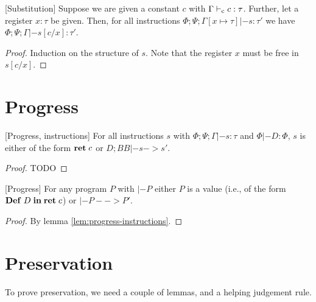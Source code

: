 \documentclass[a4paper, oneside, 10pt, draft]{memoir}
\begin{document}
\begin{lem}{[Substitution]}
  \label{lem:substitution}
  Suppose we are given a constant $c$ with $\Gamma |-_{\mathrm{c}} c :
  \tau$. Further, let a register $x : \tau$ be given. Then, for all
  instructions $\Phi;\Psi;\Gamma[x \mapsto \tau] |- s : \tau'$ we have
  $\Phi;\Psi;\Gamma |- s[c/x] : \tau'$.
\end{lem}
\begin{proof}
  Induction on the structure of $s$. Note that the register $x$ must
  be free in $s[c/x]$.
\end{proof}

\section{Progress}


\begin{lem}{[Progress, instructions]}
  \label{lem:progress-instructions}
  For all instructions $s$ with $\Phi;\Psi;\Gamma |- s : \tau$ and
  $\Phi |- D : \Phi$, $s$ is either of the form $\mathbf{ret} \; c$ or $D;BB |-
  s -> s'$.
\end{lem}
\begin{proof}
  TODO 
\end{proof}

\begin{thm}{[Progress]}
  For any program $P$ with $|- P$ either $P$ is a value (i.e., of the
  form $\mathbf{Def} \; D \; \mathbf{in} \; \mathbf{ret} \; c$) or $|- P --> P'$.
\end{thm}
\begin{proof}
  By lemma \ref{lem:progress-instructions}.
\end{proof}

\section{Preservation}

To prove preservation, we need a couple of lemmas, and a helping
judgement rule.
\end{document}
